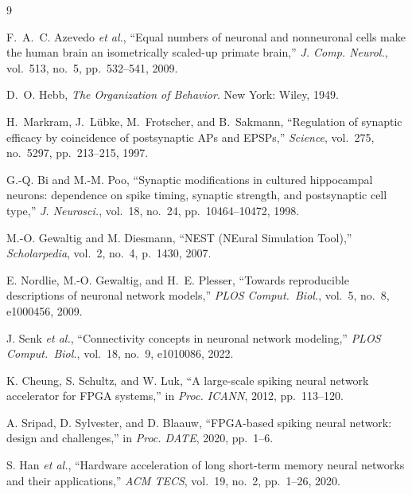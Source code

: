 \documentclass[10pt,twocolumn]{article}
\begin{document}

\begin{thebibliography}{9}

F.~A.~C. Azevedo \emph{et al.},
``Equal numbers of neuronal and nonneuronal cells make the human brain
  an isometrically scaled-up primate brain,''
\textit{J. Comp. Neurol.}, vol.~513, no.~5, pp.~532–541, 2009.

D.~O. Hebb,
\textit{The Organization of Behavior}.
New York: Wiley, 1949.

H.\ Markram, J.\ L\"{u}bke, M.\ Frotscher, and B.\ Sakmann,
``Regulation of synaptic efficacy by coincidence of postsynaptic
  APs and EPSPs,''
\textit{Science}, vol.~275, no.~5297, pp.~213--215, 1997.

G.-Q. Bi and M.-M. Poo,
``Synaptic modifications in cultured hippocampal neurons: dependence
  on spike timing, synaptic strength, and postsynaptic cell type,''
\textit{J. Neurosci.}, vol.~18, no.~24, pp.~10464–10472, 1998.

M.-O. Gewaltig and M. Diesmann,
``NEST (NEural Simulation Tool),''
\textit{Scholarpedia}, vol.~2, no.~4, p.~1430, 2007.

E. Nordlie, M.-O. Gewaltig, and H.~E. Plesser,
``Towards reproducible descriptions of neuronal network models,''
\textit{PLOS Comput.\ Biol.}, vol.~5, no.~8, e1000456, 2009.

J. Senk \emph{et al.},
``Connectivity concepts in neuronal network modeling,''
\textit{PLOS Comput.\ Biol.}, vol.~18, no.~9, e1010086, 2022.

K. Cheung, S. Schultz, and W. Luk,
``A large-scale spiking neural network accelerator for FPGA systems,''
in \textit{Proc. ICANN}, 2012, pp.~113–120.

A. Sripad, D. Sylvester, and D. Blaauw,
``FPGA-based spiking neural network: design and challenges,''
in \textit{Proc. DATE}, 2020, pp.~1–6.

S. Han \emph{et al.},
``Hardware acceleration of long short-term memory neural networks
  and their applications,''
\textit{ACM TECS}, vol.~19, no.~2, pp.~1–26, 2020.

\end{thebibliography}
\end{document}
